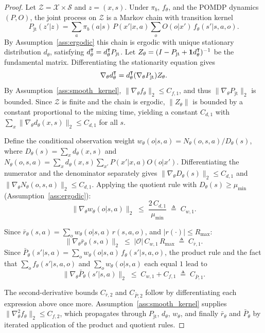 \documentclass[10pt,a4paper]{amsart}
\newcommand{\Rmax}{R_{\max}}
\newcommand\raiseT[2]{\raisebox{0.25ex}{$#1#2$}
}
\renewcommand{\top}{{\mathpalette\raiseT\intercal}}
\begin{document}
\begin{proof}
Let $\mathcal{Z} = \mathcal{X} \times \mathcal{S}$ and $z = (x,s)$. Under $\pi_b$,
$f_\theta$, and the POMDP dynamics $(P, O)$, the joint process on $\mathcal{Z}$ is a
Markov chain with transition kernel
\begin{equation*}
  P_{\mathrm{jt}}(z'|z)
  = \sum_{a} \pi_b(a|s)\, P(x'|x,a) \sum_{o} O(o|x')\, f_\theta(s'|s,a,o).
\end{equation*}
By Assumption~\ref{ass:ergodic} this chain is ergodic with unique stationary
distribution $d_\theta$, satisfying $d_\theta^\top = d_\theta^\top P_{\mathrm{jt}}$.
Let $Z_\theta = (I - P_{\mathrm{jt}} + \mathbf{1} d_\theta^\top)^{-1}$ be the fundamental
matrix. Differentiating the stationarity equation gives
\begin{equation*}
  \nabla_\theta d_\theta^\top = d_\theta^\top (\nabla_\theta P_{\mathrm{jt}}) Z_\theta.
\end{equation*}
By Assumption~\ref{ass:smooth_kernel}, $\|\nabla_\theta f_\theta\|_2 \le C_{f,1}$, and thus
$\|\nabla_\theta P_{\mathrm{jt}}\|_2$ is bounded. Since $\mathcal{Z}$ is finite and the
chain is ergodic, $\|Z_\theta\|$ is bounded by a constant proportional to the mixing
time, yielding a constant $C_{d,1}$ with
$\sum_{x}\|\nabla_\theta d_\theta(x,s)\|_2 \le C_{d,1}$ for all $s$.

Define the conditional observation weight
$w_\theta(o|s,a) = N_\theta(o,s,a) / D_\theta(s)$, where
$D_\theta(s) = \sum_x d_\theta(x,s)$ and
$N_\theta(o,s,a) = \sum_x d_\theta(x,s) \sum_{x'} P(x'|x,a) O(o|x')$.
Differentiating the numerator and the denominator separately gives
$\|\nabla_\theta D_\theta(s)\|_2 \le C_{d,1}$ and
$\|\nabla_\theta N_\theta(o,s,a)\|_2 \le C_{d,1}$.
Applying the quotient rule with $D_\theta(s) \ge \mu_{\min}$ (Assumption~\ref{ass:ergodic}):
\begin{equation*}
  \|\nabla_\theta w_\theta(o|s,a)\|_2
  \;\le\; \frac{2\,C_{d,1}}{\mu_{\min}}
  \;\triangleq\; C_{w,1}.
\end{equation*}

Since $\bar{r}_\theta(s,a) = \sum_o w_\theta(o|s,a)\,r(s,a,o)$, and $|r(\cdot)|\le\Rmax$:
\begin{equation*}
  \|\nabla_\theta \bar{r}_\theta(s,a)\|_2
  \;\le\; |\mathcal{O}|\,C_{w,1}\,\Rmax
  \;\triangleq\; C_{\bar{r},1}.
\end{equation*}
Since $\bar{P}_\theta(s'|s,a) = \sum_o w_\theta(o|s,a)\,f_\theta(s'|s,a,o)$, the
product rule and the fact that $\sum_o f_\theta(s'|s,a,o)$ and $\sum_o w_\theta(o|s,a)$
each equal $1$ lead to
\begin{equation*}
  \|\nabla_\theta \bar{P}_\theta(s'|s,a)\|_2
  \;\le\; C_{w,1} + C_{f,1}
  \;\triangleq\; C_{\bar{P},1}.
\end{equation*}

The second-derivative bounds $C_{\bar{r},2}$ and $C_{\bar{P},2}$ follow by
differentiating each expression above once more. Assumption~\ref{ass:smooth_kernel}
supplies $\|\nabla^2_\theta f_\theta\|_2 \le C_{f,2}$, which propagates through
$P_{\mathrm{jt}}$, $d_\theta$, $w_\theta$, and finally $\bar{r}_\theta$ and
$\bar{P}_\theta$ by iterated application of the product and quotient rules.
\end{proof}
\end{document}
